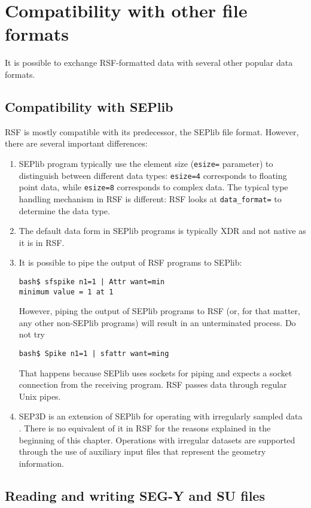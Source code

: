 \section{Compatibility with other file formats}

It is possible to exchange RSF-formatted data with several other popular data formats.

\subsection{Compatibility with SEPlib}

RSF is mostly compatible with its predecessor, the SEPlib file format.
However, there are several important differences:
\begin{enumerate}
\item SEPlib program typically use the element size (\texttt{esize=}
parameter) to distinguish between different data types:
\texttt{esize=4} corresponds to floating point data, while
\texttt{esize=8} corresponds to complex data. The typical type
handling mechanism in RSF is different: RSF looks at
\texttt{data\_format=} to determine the data type.
\item The default data form in SEPlib programs is
typically XDR and not native as it is in RSF. 
\item It is possible to pipe the
output of RSF programs to SEPlib:
\begin{verbatim}
bash$ sfspike n1=1 | Attr want=min
minimum value = 1 at 1
\end{verbatim}
However, piping the output of SEPlib programs to RSF (or, for that matter, any
other non-SEPlib programs) will result in an unterminated process. Do not try
\begin{verbatim}
bash$ Spike n1=1 | sfattr want=ming
\end{verbatim}
That happens because SEPlib uses sockets for piping and expects a socket
connection from the receiving program. RSF passes data through regular Unix
pipes.
\item SEP3D is an extension of SEPlib for operating with irregularly sampled
  data \cite[]{Biondi.sep.92.343}. There is no equivalent of it in RSF for
  the reasons explained in the beginning of this chapter. Operations with
  irregular datasets are supported through the use of auxiliary input files
  that represent the geometry information.
\end{enumerate}

\subsection{Reading and writing SEG-Y and SU files}

